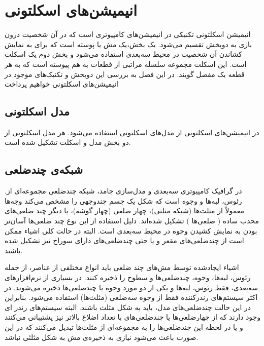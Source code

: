 \chapter { انیمیشن‌های اسکلتونی }


انیمیشن‌ اسکلتونی تکنیکی در انیمیشن‌های کامپیوتری است که در آن شخصیت درون بازی به دوبخش تقسیم ‌می‌شود. یک بخش،یک مش یا پوسته است که برای به نمایش کشاندن ‌آن شخصیت در محیط سه‌بعدی استفاده می‌شود و بخش دوم یک اسکلت است. این اسکلت مجموعه سلسله مراتبی از قطعات به‌ هم پیوسته است که به هر قطعه یک مفصل گویند.
در این فصل به بررسی این دوبخش و تکنیک‌های موجود در انیمیشن‌های اسکلتونی خواهیم پرداخت

\section{مدل اسکلتونی}

در انیمیشن‌های اسکلتونی از مدل‌های اسکلتونی استفاده می‌شود. هر مدل اسکلتونی از دو بخش مدل و اسکلت تشکیل شده است. 

\section{شبکه‌ی\protect{} چندضلعی}

.در گرافیک کامپیوتری سه‌بعدی و مدل‌سازی جامد، شبکه چند‌ضلعی مجموعه‌ای از رئوس، لبه‌ها و وجوه است که شکل یک جسم چند‌وجهی را مشخص می‌کند
وجه‌ها معمولاً از مثلث‌ها (شبکه مثلثی)، چهار ضلعی (چهار گوشه)، یا دیگر چند ضلعی‌های محدب ساده
(
	ضلعی‌ها
)
تشکیل شده‌اند. دلیل استفاده از این نوع چند ضلعی‌ها آسان‌تر بودن به نمایش کشیدن وجوه در محیط سه‌بعدی است.
البته در حالت کلی اشیاء ممکن است از چندضلعی‌های مقعر و یا حتی چندضلعی‌های دارای سوراخ نیز تشکیل شده باشند.

اشیاء ایجادشده توسط مش‌های چند ضلعی باید انواع مختلفی از عناصر، از جمله رئوس، لبه‌ها، وجوه، چندضلعی‌ها و سطوح را ذخیره کنند.
در بسیاری از نرم‌افزارهای سه‌بعدی، فقط رئوس، لبه‌ها و یکی از دو مورد وجوه یا چند‌ضلعی‌ها ذخیره می‌شوند.
در اکثر سیستم‌های رندرکننده
فقط از وجوه سه‌ضلعی
(مثلث‌ها)
استفاده‌ می‌شود.
بنابراین در این حالت چند‌ضلعی‌های مدل، باید به شکل مثلث باشند. البته سیستم‌های رندر ای وجود دارند که از چهارضلعی‌ها یا چندضلعی‌های با تعداد اضلاع بالاتر نیز پشتیبانی ‌می‌کنند و یا در لحظه این چندضلعی‌ها را به مجموعه‌ای از مثلث‌ها تبدیل می‌کنند که در این صورت باعث ‌می‌شود نیازی به ذخیره‌ی مش به شکل مثلثی نباشد.

